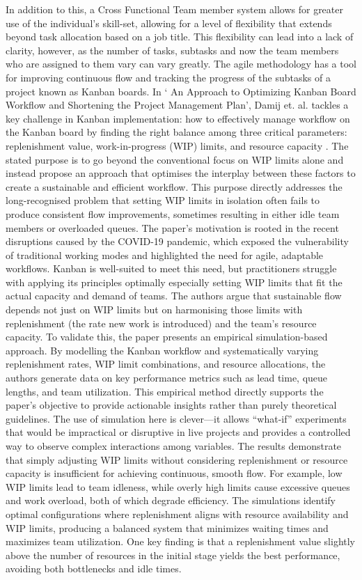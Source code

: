 \documentclass{report}
\begin{document}
In addition to this, a Cross Functional Team member system allows for greater use of the individual’s skill-set, allowing for a level of flexibility that extends beyond task allocation based on a job title. This flexibility can lead into a lack of clarity, however, as the number of tasks, subtasks and now the team members who are assigned to them vary can vary greatly. The agile methodology has a tool for improving continuous flow and tracking the progress of the subtasks of a project known as Kanban boards. In ‘ An Approach to Optimizing Kanban Board Workflow and Shortening the Project Management Plan’, Damij et. al. tackles a key challenge in Kanban implementation: how to effectively manage workflow on the Kanban board by finding the right balance among three critical parameters: replenishment value, work-in-progress (WIP) limits, and resource capacity \parencite{damijApproachOptimizingKanban2024}. The stated purpose is to go beyond the conventional focus on WIP limits alone and instead propose an approach that optimises the interplay between these factors to create a sustainable and efficient workflow. This purpose directly addresses the long-recognised problem that setting WIP limits in isolation often fails to produce consistent flow improvements, sometimes resulting in either idle team members or overloaded queues.
The paper’s motivation is rooted in the recent disruptions caused by the COVID-19 pandemic, which exposed the vulnerability of traditional working modes and highlighted the need for agile, adaptable workflows. Kanban is well-suited to meet this need, but practitioners struggle with applying its principles optimally especially setting WIP limits that fit the actual capacity and demand of teams. The authors argue that sustainable flow depends not just on WIP limits but on harmonising those limits with replenishment (the rate new work is introduced) and the team’s resource capacity.
To validate this, the paper presents an empirical simulation-based approach. By modelling the Kanban workflow and systematically varying replenishment rates, WIP limit combinations, and resource allocations, the authors generate data on key performance metrics such as lead time, queue lengths, and team utilization. This empirical method directly supports the paper’s objective to provide actionable insights rather than purely theoretical guidelines. The use of simulation here is clever—it allows “what-if” experiments that would be impractical or disruptive in live projects and provides a controlled way to observe complex interactions among variables.
The results demonstrate that simply adjusting WIP limits without considering replenishment or resource capacity is insufficient for achieving continuous, smooth flow. For example, low WIP limits lead to team idleness, while overly high limits cause excessive queues and work overload, both of which degrade efficiency. The simulations identify optimal configurations where replenishment aligns with resource availability and WIP limits, producing a balanced system that minimizes waiting times and maximizes team utilization. One key finding is that a replenishment value slightly above the number of resources in the initial stage yields the best performance, avoiding both bottlenecks and idle times.
\end{document}
